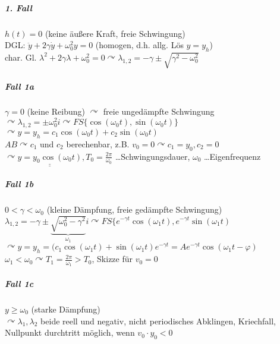 \documentclass[a4paper]{scrartcl}
\begin{document}
\subparagraph{1. Fall} $h(t) = 0$ (keine äußere Kraft, freie Schwingung)\\
DGL: $\ddot{y} + 2 \gamma \dot{y} + \omega_0^2 y = 0$ (homogen, d.h. allg. Lös $y= y_h$)\\
char. Gl. $\lambda^2 + 2\gamma \lambda + \omega_0^2 = 0 \curvearrowright \lambda_{1,2} = - \gamma \pm \sqrt{\gamma^2 - \omega_0^2}$

\subparagraph{Fall 1a} $\gamma = 0$ (keine Reibung) $\curvearrowright$ freie ungedämpfte Schwingung\\
$\curvearrowright \lambda_{1,2} = \pm \omega_0^2 i \curvearrowright FS \{ \cos{(\omega_0 t)}, \sin{(\omega_0 t)} \}$\\
$\curvearrowright y= y_h = c_1 \cos{(\omega_0 t)} + c_2 \sin{(\omega_0 t)}$\\
$AB \curvearrowright c_1 \text{ und } c_2$ berechenbar, z.B. $v_0 = 0 \curvearrowright c_1 = y_0,c_2=0$\\
$\curvearrowright \underline{\underline{y=y_0 \cos{(\omega_0 t)}}}, T_0 = \frac{2\pi}{\omega_0}$ \dots Schwingungsdauer, $\omega_0$ \dots Eigenfrequenz

\subparagraph{Fall 1b} $0 < \gamma < \omega_0$ (kleine Dämpfung, freie gedämpfte Schwingung)\\
$\lambda_{1,2} =  - \gamma \pm \underbrace{\sqrt{\omega_0^2 - \gamma^2}}_{\omega_1}i \curvearrowright FS \{ e^{-\gamma t} \cos{(\omega_1 t)}, e^{-\gamma t} \sin{(\omega_1 t)}$\\
$\curvearrowright y= y_h = (c_1 \cos{(\omega_1 t)} + \sin{(\omega_1 t)} e^{-\gamma t} = A e^{-\gamma t} \cos{(\omega_1 t - \varphi)}$\\
$\omega_1 < \omega_0 \curvearrowright T_1 = \frac{2\pi}{\omega_1} > T_0$, Skizze für $v_0 = 0$

\subparagraph{Fall 1c} $y \geq \omega_0$ (starke Dämpfung)\\
$\curvearrowright \lambda_1,\lambda_2$ beide reell und negativ, nicht periodisches Abklingen, Kriechfall, Nullpunkt durchtritt möglich, wenn $v_0 \cdot y_0 <0$
\end{document}
